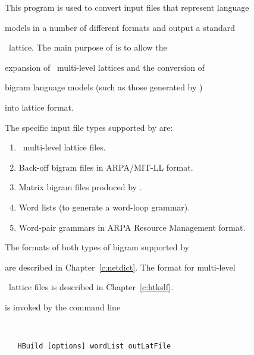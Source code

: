 This program is used to convert input files that represent language


models in a number of different formats and output a standard


\HTK\ lattice. The main purpose of  is to allow the


expansion of \HTK\ multi-level lattices and the conversion of


bigram language models (such as those generated by )


into lattice format. 





The specific input file types supported by  are:


\begin{enumerate}


\item \HTK\ multi-level lattice files.


\item Back-off bigram files in ARPA/MIT-LL format.


\item Matrix bigram files produced by .


\item Word lists (to generate a word-loop grammar).


\item Word-pair grammars in ARPA Resource Management format.


\end{enumerate}





The formats of both types of bigram supported by  


are described in Chapter~\ref{c:netdict}. The format for multi-level


\HTK\ lattice files is described in Chapter~\ref{c:htkslf}.










 is invoked by the command line


\begin{verbatim}


   HBuild [options] wordList outLatFile


\end{verbatim}


